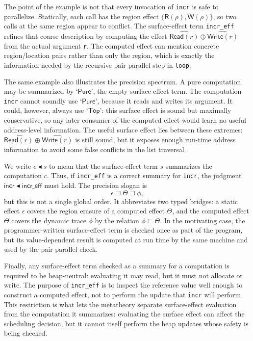 \documentclass[10pt,a4paper]{article}
\newcommand{\desc}{\mathrel{\blacktriangleleft}}      %
\newcommand{\approxx}{\mathrel{\sqsubseteq}}          %
\newcommand{\Read}{\mathsf{Read}}
\newcommand{\Write}{\mathsf{Write}}
\newcommand{\Rs}{\mathsf{R}}
\newcommand{\Ws}{\mathsf{W}}
\newcommand{\Top}{\mathsf{Top}}
\newcommand{\Pure}{\mathsf{Pure}}
\newcommand{\covers}{\mathrel{\sqsupseteq}}
\begin{document}
The point of the example is not that every invocation of \lstinline|incr| is
safe to parallelize. Statically, each call has the region effect
$\{\Rs(\rho),\Ws(\rho)\}$, so two calls at the same region appear to conflict.
The surface-effect term \lstinline|incr_eff| refines that coarse description by
computing the effect $\widehat{\Read(r)} \oplus \widehat{\Write(r)}$ from the
actual argument \lstinline|r|. The computed effect can mention concrete
region/location pairs rather than only the region, which is exactly the
information needed by the recursive pair-parallel step in \lstinline|loop|.

The same example also illustrates the precision spectrum. A pure computation
may be summarized by `$\Pure$', the empty surface-effect term. The computation
\lstinline|incr| cannot soundly use `$\Pure$', because it reads and writes its
argument. It could, however, always use `$\Top$': this surface effect is sound but
maximally conservative, so any later consumer of the computed effect would learn no
useful address-level information.
The useful surface effect lies between these extremes: $\widehat{\Read(r)} \oplus
\widehat{\Write(r)}$ is still sound, but it exposes enough run-time address information
to avoid some false conflicts in the list traversal.

We write $c \desc s$ to mean that the surface-effect term $s$ summarizes the
computation $c$. Thus, if \lstinline|incr_eff| is a correct summary for
\lstinline|incr|, the judgment $\mathsf{incr} \desc \mathsf{incr\_eff}$ must
hold. The
precision slogan is
\[
  \epsilon \covers \Theta \covers \phi,
\]
but this is not a single global order. It abbreviates two typed bridges: a
static effect $\epsilon$ covers the region erasure of a computed effect
$\Theta$, and the computed effect $\Theta$ covers the dynamic trace $\phi$ by
the relation $\phi\approxx\Theta$. In the motivating case, the
programmer-written surface-effect term is checked once as part of the program,
but its value-dependent result is computed at run time by the same machine and
used by the pair-parallel check.

Finally, any surface-effect term checked as a summary for a computation is
required to be heap-neutral: evaluating it may read, but it must not
allocate or write.
The purpose of \lstinline|incr_eff| is to inspect the reference value well enough
to construct a computed effect, not to perform the update that \lstinline|incr|
will perform. This restriction is what lets the metatheory separate
surface-effect evaluation from the computation it summarizes: evaluating the
surface effect can affect the scheduling decision, but it cannot itself perform
the heap updates whose safety is being checked.
\end{document}
